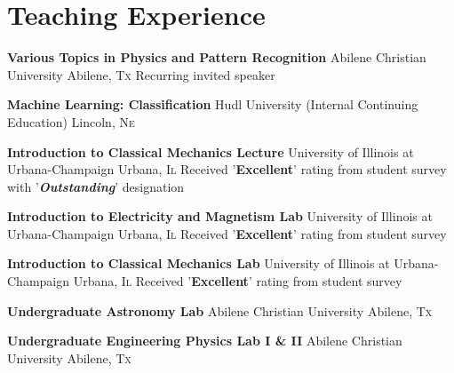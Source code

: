 \section{\textbf{Teaching Experience}}

{\textbf{Various Topics in Physics and Pattern Recognition}}
{}
{Abilene Christian University}
{Abilene, \textsc{Tx}}
{Recurring invited speaker}%

{\textbf{Machine Learning: Classification}}
{}
{Hudl University (Internal Continuing Education)}
{Lincoln, \textsc{Ne}}
{}%

{\textbf{Introduction to Classical Mechanics Lecture}}
{}
{University of Illinois at Urbana-Champaign}
{Urbana, \textsc{Il}}
{\hspace{2mm}Received '\textbf{Excellent}' rating from student survey with '\textbf{\emph{Outstanding}}' designation}%

{\textbf{Introduction to Electricity and Magnetism Lab}}
{}
{University of Illinois at Urbana-Champaign}
{Urbana, \textsc{Il}}
{\hspace{2mm}Received '\textbf{Excellent}' rating from student survey}%


{\textbf{Introduction to Classical Mechanics Lab}}
{}
{University of Illinois at Urbana-Champaign}
{Urbana, \textsc{Il}}
{\hspace{2mm}Received '\textbf{Excellent}' rating from student survey}%

{\textbf{Undergraduate Astronomy Lab}}
{}
{Abilene Christian University}
{Abilene, \textsc{Tx}}
{}%

{\textbf{Undergraduate Engineering Physics Lab I \& II}}
{}
{Abilene Christian University}
{Abilene, \textsc{Tx}}
{}%

